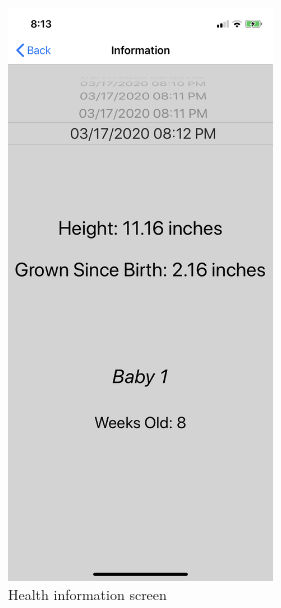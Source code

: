 \documentclass[onecolumn, draftclsnofoot,10pt, compsoc]{IEEEtran}
\begin{document}
\begin{figure}[h!]
\centering
\includegraphics[width=70mm]{./images/health-info-screen.png}
\caption{Health information screen}
\end{figure}
\end{document}
